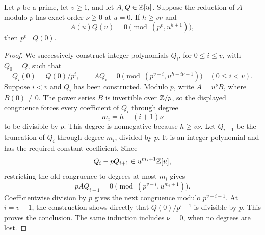 \begin{lemma}\label{lem:index-padic-truncation}
Let \(p\) be a prime, let \(v\ge1\), and let
\(A,Q\in\mathbb Z[u]\).  Suppose the reduction of \(A\) modulo \(p\)
has exact order \(\nu\ge0\) at \(u=0\).
If \(h\ge v\nu\) and
\[
 A(u)Q(u)=0\pmod{(p^v,u^{h+1})},
\]
then \(p^v\mid Q(0)\).
\end{lemma}

\begin{proof}
We successively construct integer polynomials \(Q_i\),
for \(0\le i\le v\), with \(Q_0=Q\), such that
\[
 Q_i(0)=Q(0)/p^i,\qquad
 A Q_i=0\pmod{(p^{v-i},u^{h-i\nu+1})}
       \quad(0\le i<v).
\]
Suppose \(i<v\) and \(Q_i\) has been constructed.
Modulo \(p\), write \(A=u^\nu B\), where \(B(0)\ne0\).
The power series \(B\) is invertible over \(\mathbb Z/p\), so the displayed
congruence forces every coefficient of \(Q_i\) through degree
\[
 m_i=h-(i+1)\nu
\]
to be divisible by \(p\).  This degree is nonnegative because
\(h\ge v\nu\).
Let \(Q_{i+1}\) be the truncation of \(Q_i\) through degree \(m_i\),
divided by \(p\).
It is an integer polynomial and has the required constant
coefficient.  Since
\[
 Q_i-pQ_{i+1}\in u^{m_i+1}\mathbb Z[u],
\]
restricting the old congruence to degrees at most \(m_i\) gives
\[
 p A Q_{i+1}=0\pmod{(p^{v-i},u^{m_i+1})}.
\]
Coefficientwise division by \(p\) gives the next congruence
modulo \(p^{v-i-1}\).
At \(i=v-1\), the construction shows directly that
\(Q(0)/p^{v-1}\) is divisible by \(p\).
This proves the conclusion.  The same induction includes
\(\nu=0\), when no degrees are lost.
\end{proof}

